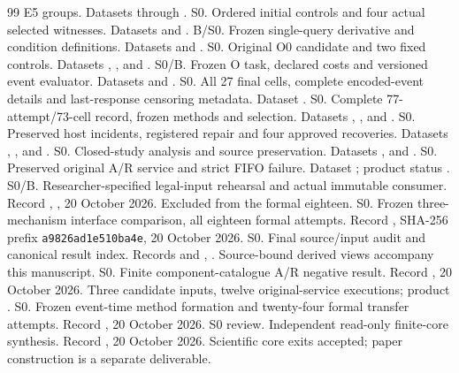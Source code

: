 \documentclass[10pt]{article}
\begin{document}
\begin{thebibliography}{99}
E5 groups. Datasets  through
.
 S0. Ordered initial controls and four actual selected
witnesses. Datasets  and
.
 B/S0. Frozen single-query derivative and condition
definitions. Datasets  and
.
 S0. Original O0 candidate and two fixed controls. Datasets
, ,
 and .
 S0/B. Frozen O task, declared costs and versioned event
evaluator. Datasets  and .
 S0. All 27 final cells, complete encoded-event details and
last-response censoring metadata. Dataset .
 S0. Complete 77-attempt/73-cell record, frozen methods and
selection. Datasets , ,
 and .
 S0. Preserved host incidents, registered repair and four
approved recoveries. Datasets ,
, 
and .
 S0. Closed-study analysis and source preservation.
Datasets , 
and .
 S0. Preserved original A/R service and strict FIFO failure.
Dataset ; product status .
 S0/B. Researcher-specified legal-input rehearsal and actual
immutable consumer. Record ,
, 20 October 2026. Excluded from the formal eighteen.
 S0. Frozen three-mechanism interface comparison, all eighteen
formal attempts. Record , SHA-256 prefix
\texttt{a9826ad1e510ba4e}, 20 October 2026.
 S0. Final source/input audit and canonical result index.
Records  and ,
. Source-bound derived views accompany this manuscript.
 S0. Finite component-catalogue A/R negative result.
Record , 20 October 2026. Three candidate inputs,
twelve original-service executions; product .
 S0. Frozen event-time method formation and twenty-four formal
transfer attempts. Record , 20 October 2026.
 S0 review. Independent read-only finite-core synthesis.
Record , 20 October 2026. Scientific core exits
accepted; paper construction is a separate deliverable.
\end{thebibliography}
\end{document}
